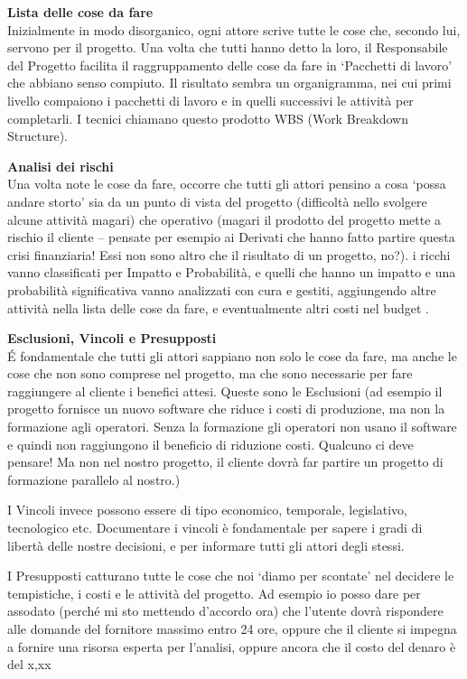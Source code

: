 \textbf{Lista delle cose da fare}\\
Inizialmente in modo disorganico, ogni attore scrive tutte le cose che, secondo lui, servono per il progetto. Una volta che tutti hanno detto la loro, il Responsabile del Progetto facilita il raggruppamento delle cose da fare in ‘Pacchetti di lavoro’ che abbiano senso compiuto. Il risultato sembra un organigramma, nei cui primi livello compaiono i pacchetti di lavoro e in quelli successivi le attività per completarli. I tecnici chiamano questo prodotto WBS (Work Breakdown Structure).

\textbf{Analisi dei rischi}\\
Una volta note le cose da fare, occorre che tutti gli attori pensino a cosa ‘possa andare storto’ sia da un punto di vista del progetto (difficoltà nello svolgere alcune attività magari) che operativo (magari il prodotto del progetto mette a rischio il cliente – pensate per esempio ai Derivati che hanno fatto partire questa crisi finanziaria! Essi non sono altro che il risultato di un progetto, no?). i ricchi vanno classificati per Impatto e Probabilità, e quelli che hanno un impatto e una probabilità significativa vanno analizzati con cura e gestiti, aggiungendo altre attività nella lista delle cose da fare, e eventualmente altri costi nel budget .

\textbf{Esclusioni, Vincoli e Presupposti}\\
É fondamentale che tutti gli attori sappiano non solo le cose da fare, ma anche le cose che non sono comprese nel progetto, ma che sono necessarie per fare raggiungere al cliente i benefici attesi. Queste sono le Esclusioni (ad esempio il progetto fornisce un nuovo software che riduce i costi di produzione, ma non la formazione agli operatori. Senza la formazione gli operatori non usano il software e quindi non raggiungono il beneficio di riduzione costi. Qualcuno ci deve pensare! Ma non nel nostro progetto, il cliente dovrà far partire un progetto di formazione parallelo al nostro.)

I Vincoli invece possono essere di tipo economico, temporale, legislativo, tecnologico etc. Documentare i vincoli è fondamentale per sapere i gradi di libertà delle nostre decisioni, e per informare tutti gli attori degli stessi.

I Presupposti catturano tutte le cose che noi ‘diamo per scontate’ nel decidere le tempistiche, i costi e le attività del progetto. Ad esempio io posso dare per assodato (perché mi sto mettendo d’accordo ora) che l’utente dovrà rispondere alle domande del fornitore massimo entro 24 ore, oppure che il cliente si impegna a fornire una risorsa esperta per l’analisi, oppure ancora che il costo del denaro è del x,xx%

